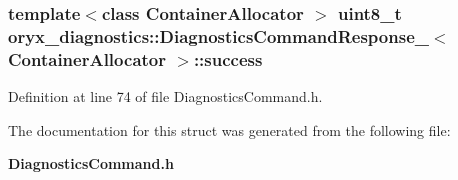 \subsubsection[{success}]{\setlength{\rightskip}{0pt plus 5cm}template$<$class Container\-Allocator $>$ uint8\-\_\-t {\bf oryx\-\_\-diagnostics\-::\-Diagnostics\-Command\-Response\-\_\-}$<$ \-Container\-Allocator $>$\-::{\bf success}}\label{structoryx__diagnostics_1_1DiagnosticsCommandResponse___a876b1860ee4eba9f88397f8d9c479f40}


\-Definition at line 74 of file \-Diagnostics\-Command.\-h.



\-The documentation for this struct was generated from the following file\-:\begin{DoxyCompactItemize}
\item 
{\bf \-Diagnostics\-Command.\-h}\end{DoxyCompactItemize}
